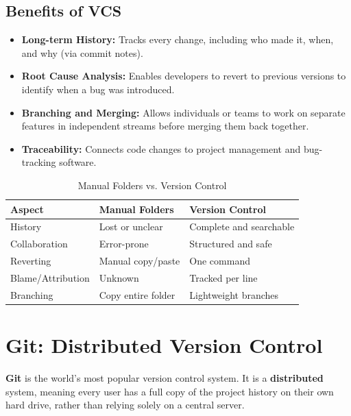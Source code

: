 \documentclass[11pt,a4paper]{article}
\begin{document}
\subsection{Benefits of VCS}

\begin{itemize}[leftmargin=*]
    \item \textbf{Long-term History:} Tracks every change, including who made it, when, and why (via commit notes).
    
    \item \textbf{Root Cause Analysis:} Enables developers to revert to previous versions to identify when a bug was introduced.
    
    \item \textbf{Branching and Merging:} Allows individuals or teams to work on separate features in independent streams before merging them back together.
    
    \item \textbf{Traceability:} Connects code changes to project management and bug-tracking software.
\end{itemize}

\begin{table}[h]
\centering
\begin{tabular}{@{}lll@{}}
\toprule
\textbf{Aspect} & \textbf{Manual Folders} & \textbf{Version Control} \\
\midrule
History & Lost or unclear & Complete and searchable \\
Collaboration & Error-prone & Structured and safe \\
Reverting & Manual copy/paste & One command \\
Blame/Attribution & Unknown & Tracked per line \\
Branching & Copy entire folder & Lightweight branches \\
\bottomrule
\end{tabular}
\caption{Manual Folders vs. Version Control}
\end{table}

\section{Git: Distributed Version Control}

\textbf{Git} is the world's most popular version control system. It is a \textbf{distributed} system, meaning every user has a full copy of the project history on their own hard drive, rather than relying solely on a central server.
\end{document}
